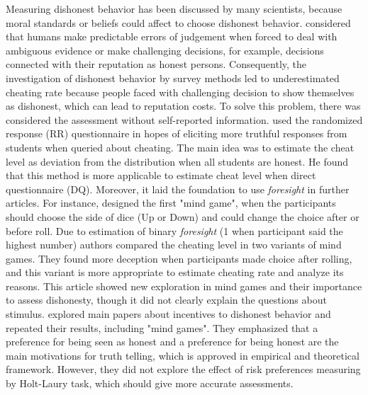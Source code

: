 \documentclass[12pt]{article}
\begin{document}
	 Measuring dishonest behavior has been discussed by many scientists, because moral standards or beliefs could affect to choose dishonest behavior. \cite{tversky1974judgment} considered that humans make predictable errors of judgement when forced to deal with ambiguous evidence or make challenging decisions, for example, decisions connected with their reputation as honest persons. Consequently, the investigation of dishonest behavior by survey methods led to underestimated cheating rate because people faced with challenging decision to show themselves as dishonest, which can lead to reputation costs.
	 To solve this problem, there was considered the assessment without self-reported information.  \cite{kerkvliet1994cheating} used the randomized response (RR) questionnaire in hopes of eliciting more truthful responses from students when queried about cheating. The main idea was to estimate the cheat level as deviation from the distribution when all students are honest. He found that this method is more applicable to estimate cheat level when direct questionnaire (DQ). Moreover, it laid the foundation to use \textit{foresight} in further articles.
	 For instance,  \cite{jiang2013cheating} designed the first "mind game", when the participants should choose the side of  dice (Up or Down) and could change the choice after or before roll. Due to estimation of binary \textit{foresight} (1 when participant said the highest number) authors compared the cheating level in two variants of mind games. They found more deception when participants made choice after rolling, and this variant is more appropriate to estimate cheating rate and analyze its reasons. This article showed new exploration in mind games and their importance to assess dishonesty, though it did not clearly explain the questions about stimulus.
	 \cite{abeler2019preferences} explored main papers about incentives to dishonest behavior and repeated their results, including "mind games". They emphasized that a preference for being seen as honest and a preference for being honest are the main motivations for truth telling, which is approved in empirical and theoretical framework. However, they did not explore the effect of risk preferences measuring by Holt-Laury task, which should give more accurate assessments.
	 
\end{document}
